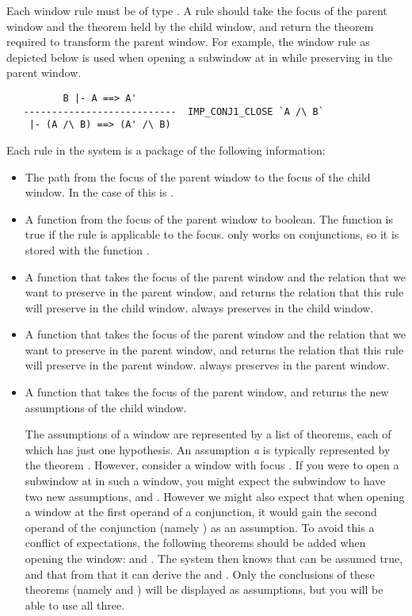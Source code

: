 Each window rule must be of type .
A rule should take the focus of the parent window and the theorem held
by the child window, and return the theorem required to transform the parent
window.
For example, the window rule  as depicted below is used
when opening a subwindow at  in  while preserving
 in the parent window.
\begin{verbatim}
          B |- A ==> A'
   ---------------------------  IMP_CONJ1_CLOSE `A /\ B` 
    |- (A /\ B) ==> (A' /\ B)
\end{verbatim}
Each rule in the system is a package of the following information:
\begin{itemize}
	\item	The path from the focus of the parent window to the focus
		of the child window.
		In the case of  this is 
		.
	\item	A function from the focus of the parent window to boolean.
		The function is true if the rule is applicable to the focus.
		 only works on conjunctions,
		so it is stored with the function .
	\item	A function that takes the focus of the parent window and
		the relation that we want to preserve in the parent window,
		and returns the relation that this rule will preserve in
		the child window.
		 always preserves  in the
		child window.
	\item	A function that takes the focus of the parent window and
		the relation that we want to preserve in the parent window,
		and returns the relation that this rule will preserve in
		the parent window.
		 always preserves  in the
		parent window.
	\item	A function that takes the focus of the parent window,
		and returns the new assumptions of the child window.

		The assumptions of a window are represented by a list of
		theorems, each of which has just one hypothesis.
		An assumption {\it a}\/ is typically represented by the
		theorem .
		However, consider a window with focus
		.
		If you were to open a subwindow at  in such a 
		window, you might expect the subwindow to have two new
		assumptions,  and .
		However we might also expect that when opening a window at the
		first operand of a conjunction, it would gain the second
		operand of the conjunction (namely )
		 as an assumption.
		To avoid this a conflict of expectations, the following
		theorems should be added when opening the window:
		 and
		.
		The system then knows that  can
		be assumed true, and that from that it can derive the
		 and .
		Only the conclusions of these theorems 
		(namely  and ) will be displayed as
		assumptions, but you will be able to use all three.


\end{itemize}
